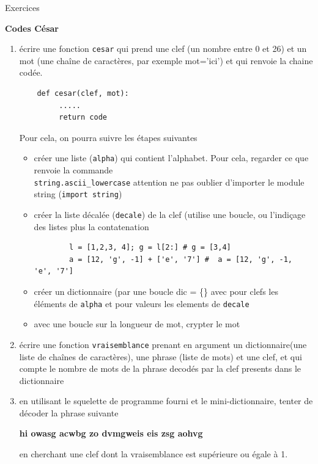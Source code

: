 \documentclass[11pt]{letter}
\begin{document}

\begin{center}
{\Large Exercices  }
\end{center}

\textbf{Codes César}
\begin{enumerate}
   \item écrire une fonction \texttt{cesar} qui prend une clef (un nombre entre 0 et 26) et un mot (une chaîne de caractères, par exemple mot='ici')
   et qui renvoie la chaine codée. 
   \begin{lstlisting}
    def cesar(clef, mot):
         .....
         return code
   \end{lstlisting}
   Pour cela, on pourra suivre les étapes suivantes 
    \begin{itemize}
      \item créer une liste (\texttt{alpha}) qui contient l'alphabet. Pour cela, regarder ce que renvoie la commande \\ 
      \texttt{string.ascii\_lowercase}
      attention ne pas oublier d'importer le module string (\texttt{import string})
      \item créer la liste décalée (\texttt{decale}) de la clef (utilise une boucle, ou l'indiçage des listes plus la contatenation 
      \begin{lstlisting}
        l = [1,2,3, 4]; g = l[2:] # g = [3,4]
        a = [12, 'g', -1] + ['e', '7'] #  a = [12, 'g', -1, 'e', '7']
       \end{lstlisting}
      \item créer un dictionnaire (par une boucle dic = \{\} avec pour clefs les éléments de \texttt{alpha} et pour valeurs les
      elements de \texttt{decale}
      \item avec une boucle sur la longueur de mot, crypter le mot
    \end{itemize}
   \item écrire une fonction \texttt{vraisemblance} prenant en argument un dictionnaire(une liste de chaînes de caractères), une phrase (liste
   de mots) et une clef, et qui compte le nombre de mots de la phrase decodés par la clef presents dans le dictionnaire
   \item en utilisant le squelette de programme fourni et le mini-dictionnaire, tenter de décoder la phrase suivante \\
   \begin{center}
   {\large \bf hi owasg acwbg zo dvmgweis eis zsg aohvg}
   \end{center} 
  

   en cherchant une clef dont la vraisemblance est supérieure ou égale à 1.
\end{enumerate}
\end{document}
